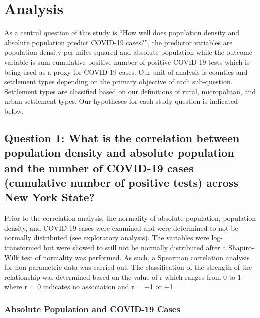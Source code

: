 \documentclass[
  12pt,
]{article}
\begin{document}
\hypertarget{analysis}{%
\section{Analysis}\label{analysis}}

As a central question of this study is ``How well does population
density and absolute population predict COVID-19 cases?'', the predictor
variables are population density per miles squared and absolute
population while the outcome variable is sum cumulative positive number
of positive COVID-19 tests which is being used as a proxy for COVID-19
cases. Our unit of analysis is counties and settlement types depending
on the primary objective of each sub-question. Settlement types are
classified based on our definitions of rural, micropolitan, and urban
settlement types. Our hypotheses for each study question is indicated
below.

\hypertarget{question-1-what-is-the-correlation-between-population-density-and-absolute-population-and-the-number-of-covid-19-cases-cumulative-number-of-positive-tests-across-new-york-state}{%
\subsection{Question 1: What is the correlation between population
density and absolute population and the number of COVID-19 cases
(cumulative number of positive tests) across New York
State?}\label{question-1-what-is-the-correlation-between-population-density-and-absolute-population-and-the-number-of-covid-19-cases-cumulative-number-of-positive-tests-across-new-york-state}}

Prior to the correlation analysis, the normality of absolute population,
population density, and COVID-19 cases were examined and were determined
to not be normally distributed (see exploratory analysis). The variables
were log-transformed but were showed to still not be normally
distributed after a Shapiro-Wilk test of normality was performed. As
such, a Spearman correlation analysis for non-parametric data was
carried out. The classification of the strength of the relationship was
determined based on the value of r which ranges from 0 to 1 where r = 0
indicates no association and r = −1 or +1.

\hypertarget{absolute-population-and-covid-19-cases}{%
\subsubsection{Absolute Population and COVID-19
Cases}\label{absolute-population-and-covid-19-cases}}
\end{document}

